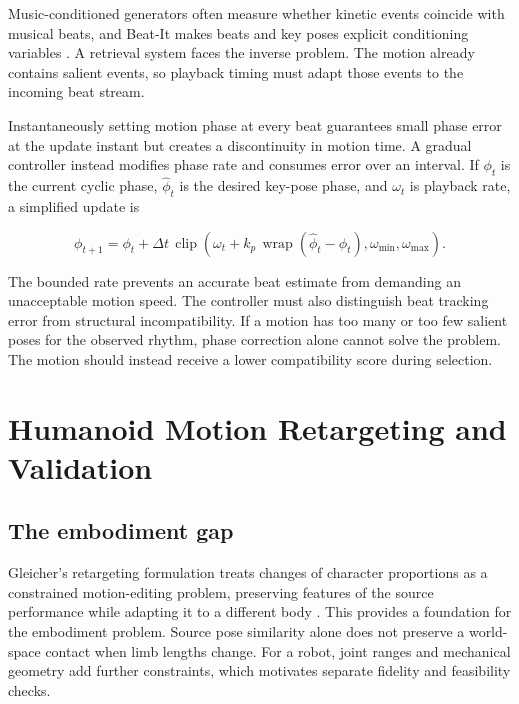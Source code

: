 Music-conditioned generators often measure whether kinetic events coincide
with musical beats, and Beat-It makes beats and key poses explicit conditioning
variables \cite{huang2024beat}. A retrieval system faces the inverse problem.
The motion already contains salient events, so playback timing must adapt those
events to the incoming beat stream.

Instantaneously setting motion phase at every beat guarantees small phase error
at the update instant but creates a discontinuity in motion time. A gradual
controller instead modifies phase rate and consumes error over an interval. If
$\phi_t$ is the current cyclic phase, $\hat{\phi}_t$ is the desired key-pose
phase, and $\omega_t$ is playback rate, a simplified update is

\begin{equation}
    \phi_{t+1}
    = \phi_t + \Delta t\,
      \operatorname{clip}\!\left(
        \omega_t + k_p\,\operatorname{wrap}(\hat{\phi}_t-\phi_t),
        \omega_{\min},\omega_{\max}
      \right).
\end{equation}

The bounded rate prevents an accurate beat estimate from demanding an
unacceptable motion speed. The controller must also distinguish beat tracking
error from structural incompatibility. If a motion has too many or too few
salient poses for the observed rhythm, phase correction alone cannot solve the
problem. The motion should instead receive a lower compatibility score during
selection.

\section{Humanoid Motion Retargeting and Validation}
\label{sec:lit_retargeting}

\subsection{The embodiment gap}
\label{subsec:lit_embodiment_gap}

Gleicher's retargeting formulation treats changes of character proportions as
a constrained motion-editing problem, preserving features of the source
performance while adapting it to a different body \cite{gleicher1998retargetting}.
This provides a foundation for the embodiment problem. Source pose similarity
alone does not preserve a world-space contact when limb lengths change.
For a robot, joint ranges and mechanical geometry add further constraints,
which motivates separate fidelity and feasibility checks.

